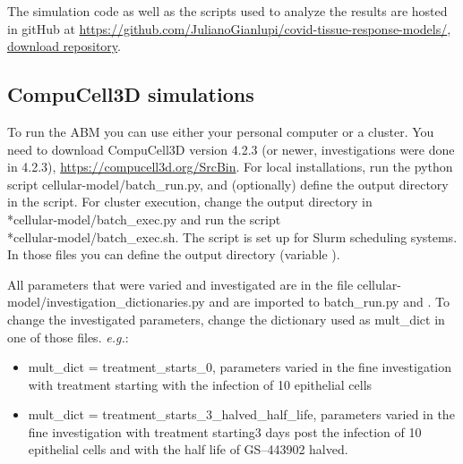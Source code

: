 The simulation code as well as the scripts used to analyze the results are hosted in gitHub at \href{https://github.com/JulianoGianlupi/covid-tissue-response-models/}{https://github.com/JulianoGianlupi/covid-tissue-response-models/}, \href{https://github.com/JulianoGianlupi/covid-tissue-response-models/zipball/fossilized-repo/}{download repository}. 

\subsection{CompuCell3D simulations}\label{sup:sec:cc3d_instructions:sims}
To run the ABM you can use either your personal computer or a cluster. You need to download CompuCell3D version 4.2.3 (or newer, investigations were done in 4.2.3), \url{https://compucell3d.org/SrcBin}. For local installations, run the python script {\selectfont cellular-model/batch\_run.py}, and (optionally) define the output directory in the script. For cluster execution, change the output directory in \\*{\selectfont cellular-model/batch\_exec.py} and run the script \\*{\selectfont cellular-model/batch\_exec.sh}. The script is set up for Slurm scheduling systems. In those files you can define the output directory (variable ).

All parameters that were varied and investigated are in the file {\selectfont cellular-model/\linebreak investigation\_dictionaries.py} and are imported to {\selectfont batch\_run.py} and . To change the investigated parameters, change the dictionary used as {\selectfont mult\_dict} in one of those files. \emph{e.g.}:

\begin{itemize}
    \item {\selectfont mult\_dict = treatment\_starts\_0}, parameters varied in the fine investigation with treatment starting with the infection of 10 epithelial cells
    \item {\selectfont mult\_dict = treatment\_starts\_3\_halved\_half\_life}, parameters varied in the fine investigation with treatment starting3 days post the infection of 10 epithelial cells and with the half life of GS--443902 halved.
\end{itemize}

